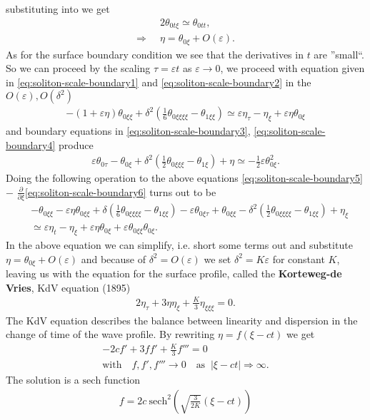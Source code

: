 substituting into \label{eq:solitionO0} we get
\begin{align}
        &2\theta_{0t\xi}\simeq\theta_{0t t},\\
    \Rightarrow\;\;&\eta= \theta_{0\xi}+O(\varepsilon).
\end{align}
As for the surface boundary condition we see that the derivatives in $t$ are
''small``. So we can proceed by the scaling $\tau = \varepsilon t$ as
$\varepsilon\rightarrow 0$, we proceed with equation given in
\ref{eq:soliton-scale-boundary1} and \ref{eq:soliton-scale-boundary2} in the
$O(\varepsilon), O(\delta^2)$
\begin{align}\label{eq:soliton-scale-boundary5}
    -(1+\varepsilon\eta)\theta_{0\xi\xi}+
    \delta^2\left(\frac{1}{6}\theta_{0\xi\xi\xi\xi} - \theta_{1\xi\xi}\right)\simeq
    \varepsilon\eta_\tau -\eta_\xi +\varepsilon\eta\theta_{0\xi}
\end{align}
and boundary equations in \ref{eq:soliton-scale-boundary3},
\ref{eq:soliton-scale-boundary4} produce
\begin{align}\label{eq:soliton-scale-boundary6}
   \varepsilon\theta_{0\tau}-\theta_{0\xi}+\delta^2\left(
   \frac{1}{2}\theta_{0\xi\xi\xi} - \theta_{1\xi} \right) +\eta \simeq
   -\frac{1}{2}\varepsilon \theta^2_{0\xi}.
\end{align}
Doing the following operation to the above equations
\ref{eq:soliton-scale-boundary5} $-$ $\frac{\partial }{\partial
\xi}$\ref{eq:soliton-scale-boundary6} turns out to be
\begin{align}
    &-\theta_{0\xi\xi}-
    \varepsilon\eta\theta_{0\xi\xi}+
    \delta\left(\frac{1}{6}\theta_{0\xi\xi\xi\xi}-\theta_{1\xi\xi}\right)
    - \varepsilon\theta_{0\xi\tau}+\theta_{0\xi\xi}-\delta^2\left(
        \frac{1}{2}\theta_{0\xi\xi\xi\xi} -
    \theta_{1\xi\xi}\right)+\eta_{\xi}\\
    &\simeq \varepsilon\eta_t - \eta_\xi+
    \varepsilon\eta\theta_{0\xi}+\varepsilon\theta_{0\xi\xi}\theta_{0\xi}.
\end{align}
In the above equation we can simplify, i.e. short some terms out and
substitute $\eta = \theta_{0\xi} + O(\varepsilon)$ and because of $\delta^2 =
O(\varepsilon)$ we set $\delta^2 = K\varepsilon$ for constant $K$, leaving us
with the equation for the surface profile, called the \textbf{Korteweg-de
Vries}, KdV equation (1895)
\begin{align}
    2\eta_\tau + 3\eta\eta_\xi + \frac{K}{3}\eta_{\xi\xi\xi} = 0.
\end{align}
The KdV equation describes the balance between linearity and dispersion in
the change of time of the wave profile. By rewriting $\eta = f(\xi-ct)$ we
get
\begin{align}
    -2cf' + 3ff' + \frac{K}{3}f''' = 0\\
    \text{with} \quad f, f', f''' \rightarrow 0\quad \text{as}\;\;  |\xi-ct|
    \Rightarrow \infty.
\end{align}
The solution is a $\text{sech}$ function
\begin{align}
    f = 2c\ \text{sech}^2\left( \sqrt{\frac{3}{2K}}(\xi-ct)\right)
\end{align}

